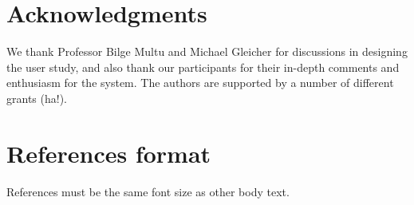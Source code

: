 \documentclass{sigchi}
\newcommand\tabhead[1]{\small\textbf{#1}}
\begin{document}


\section{Acknowledgments}

We thank Professor Bilge Multu and Michael Gleicher for discussions in designing the user study, and also thank our participants for their in-depth comments and enthusiasm for the system.  The authors are supported by a number of different grants (ha!).

%
%
%
%
%
\balance

\section{References format}
References must be the same font size as other body text.



\end{document}
